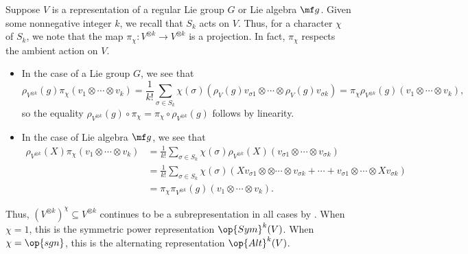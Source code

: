 \documentclass[../notes.tex]{subfiles}
\begin{document}
\begin{example}
	Suppose $V$ is a representation of a regular Lie group $G$ or Lie algebra $\mf g$. Given some nonnegative integer $k$, we recall that $S_k$ acts on $V$. Thus, for a character $\chi$ of $S_k$, we note that the map $\pi_\chi\colon V^{\otimes k}\to V^{\otimes k}$ is a projection. In fact, $\pi_\chi$ respects the ambient action on $V$.
	\begin{itemize}
		\item In the case of a Lie group $G$, we see that
		\[\rho_{V^{\otimes k}}(g)\pi_\chi(v_1\otimes\cdots\otimes v_k)=\frac1{k!}\sum_{\sigma\in S_k}\chi(\sigma)(\rho_V(g)v_{\sigma1}\otimes\cdots\otimes\rho_V(g)v_{\sigma k})=\pi_\chi\rho_{V^{\otimes k}}(g)(v_1\otimes\cdots\otimes v_k),\]
		so the equality $\rho_{V^{\otimes k}}(g)\circ\pi_\chi=\pi_\chi\circ\rho_{V^{\otimes k}}(g)$ follows by linearity.
		\item In the case of Lie algebra $\mf g$, we see that
		\begin{align*}
			\rho_{V^{\otimes k}}(X)\pi_\chi(v_1\otimes\cdots\otimes v_k) &= \frac1{k!}\sum_{\sigma\in S_k}\chi(\sigma)\rho_{V^{\otimes k}}(X)(v_{\sigma1}\otimes\cdots\otimes v_{\sigma k}) \\
			&= \frac1{k!}\sum_{\sigma\in S_k}\chi(\sigma)(Xv_{\sigma1}\otimes \otimes\cdots\otimes v_{\sigma k}+\cdots+v_{\sigma1}\otimes\cdots\otimes Xv_{\sigma k}) \\
			&= \pi_\chi\pi_{V^{\otimes k}}(g)(v_1\otimes\cdots\otimes v_k).
		\end{align*}
	\end{itemize}
	Thus, $\left(V^{\otimes k}\right)^\chi\subseteq V^{\otimes k}$ continues to be a subrepresentation in all cases by . When $\chi=1$, this is the symmetric power representation $\op{Sym}^k(V)$. When $\chi=\op{sgn}$, this is the alternating representation $\op{Alt}^k(V)$.
\end{example}
\end{document}
